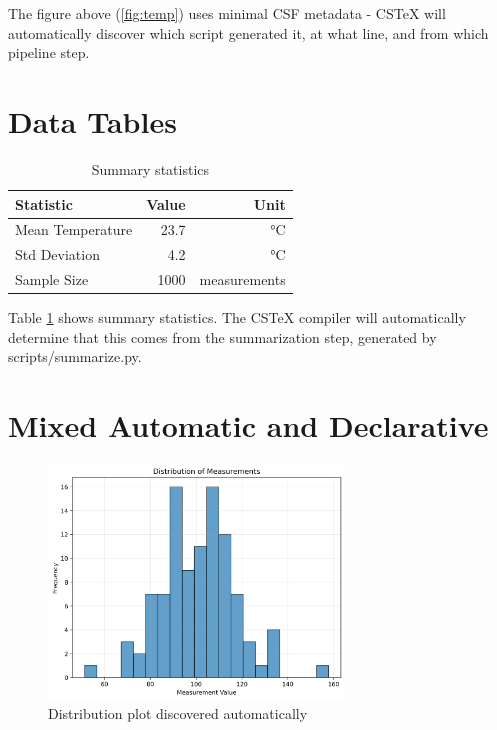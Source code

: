 \documentclass{article}
\begin{document}
The figure above (\ref{fig:temp}) uses minimal CSF metadata - CSTeX will automatically 
discover which script generated it, at what line, and from which pipeline step.

\section{Data Tables}

\begin{table}[h]
\centering
\begin{tabular}{|l|r|r|}
\hline
Statistic & Value & Unit \\
\hline
Mean Temperature & 23.7 & °C \\
Std Deviation & 4.2 & °C \\
Sample Size & 1000 & measurements \\
\hline
\end{tabular}
\caption{Summary statistics}
\label{tab:summary}
\end{table}

Table \ref{tab:summary} shows summary statistics. The CSTeX compiler will automatically
determine that this comes from the summarization step, generated by scripts/summarize.py.

\section{Mixed Automatic and Declarative}

\begin{figure}[h]
\centering
\includegraphics[width=0.7\textwidth]{figures/measurement_distribution.png}
\caption{Distribution plot discovered automatically}
\label{fig:auto}
\end{figure}
\end{document}
